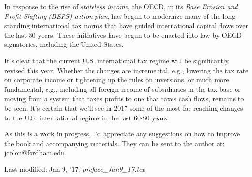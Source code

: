 In response to the rise of \emph{stateless income}, the OECD, in its \emph{Base Erosion and Profit Shifting (BEPS) action plan}, has begun to modernize many of the long-standing international tax norms that have guided international capital flows over the last 80 years.  These initiatives have begun to be enacted into law by OECD signatories, including the United States.

It's clear that the current U.S. international tax regime will be significantly revised this year.  Whether the changes are incremental, e.g., lowering the tax rate on corporate income or tightening up the rules on inversions, or much more fundamental, e.g., including all foreign income of subsidiaries in the tax base or moving from a system that taxes profits to one that taxes cash flows, remains to be seen.  It's certain that we'll see in 2017 some of the most far reaching changes to the U.S. international regime in the last 60-80 years.  

As this is a work in progress, I'd appreciate any suggestions on how to improve the book and accompanying materials.  They can be sent to the author at:  jcolon@fordham.edu.    


\begin{framed}
Last modified:  Jan 9, '17; \emph{preface\_Jan9\_17.tex}
\end{framed}